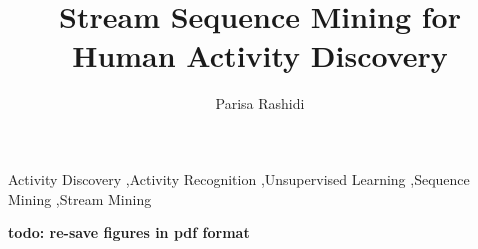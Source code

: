 \documentclass{elsarticle}
\theoremstyle{definition}
\begin{document}
\begin{frontmatter}

\title{Stream Sequence Mining for Human Activity Discovery}

\author{Parisa Rashidi}
\address{Biomedical Informatics Division, \\ Health and Engineering Center, \\ Northwestern University, \\ Chicago, IL, US}


\begin{keyword}
Activity Discovery \sep Activity Recognition \sep Unsupervised Learning \sep Sequence Mining \sep Stream Mining
\end{keyword}

\end{frontmatter}

\textbf{todo: re-save figures in pdf format}


\end{document}
